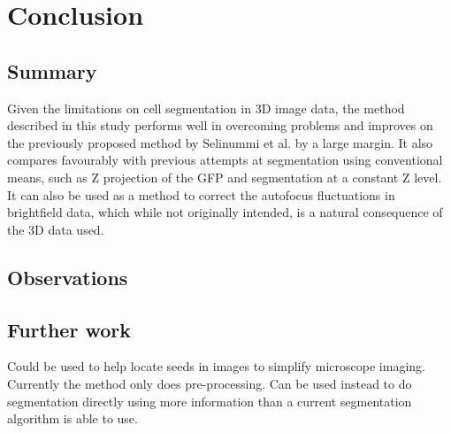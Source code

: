 
\chapter{Conclusion}

\ifpdf
    \graphicspath{{Chapter6/Figs/Raster/}{Chapter6/Figs/PDF/}{Chapter6/Figs/}}
\else
    \graphicspath{{Chapter6/Figs/Vector/}{Chapter6/Figs/}}
\fi

\section{Summary}

Given the limitations on cell segmentation in 3D image data, the method described in this study performs well in overcoming problems and improves on the previously proposed method by Selinummi et al. by a large margin. It also compares favourably with previous attempts at segmentation using conventional means, such as Z projection of the GFP and segmentation at a constant Z level. It can also be used as a method to correct the autofocus fluctuations in brightfield data, which while not originally intended, is a natural consequence of the 3D data used.

\section{Observations}



\section{Further work}

Could be used to help locate seeds in images to simplify microscope imaging.
Currently the method only does pre-processing. Can be used instead to do segmentation directly using more information than a current segmentation algorithm is able to use.
